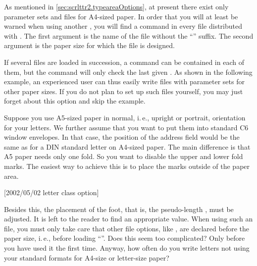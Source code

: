 \begin{Explain}
\begin{Declaration}
\end{Declaration}
As mentioned in \autoref{sec:scrlttr2.typeareaOptions}, at present
there exist only parameter sets and  files for A4-sized
paper. In order that you will at least be warned when using another
, you will find a 
command in every  file distributed with {\KOMAScript}. The
first argument is the name of the  file without the
``'' suffix. The second argument is the paper size for
which the  file is designed.

If several  files are loaded in succession, a
 command can be contained in each of
them, but the  command will only check the last given
. As shown in the following example, an experienced
user can thus easily write  files with parameter sets for
other paper sizes. If you do not plan to set up such  files
yourself, you may just forget about this option and skip the example.

\begin{Example}
  Suppose you use A5-sized paper in normal, i.\,e., upright or
  portrait, orientation for your letters. We further assume that you
  want to put them into standard C6 window envelopes. In that case,
  the position of the address field would be the same as for a DIN
  standard letter on A4-sized paper. The main difference is that A5
  paper needs only one fold. So you want to disable the upper and
  lower fold marks. The easiest way to achieve this is to place the
  marks outside of the paper area.
\begin{lstcode}
  [2002/05/02 letter class option]
\end{lstcode}
Besides this, the placement of the foot, that is, the pseudo-length
, must be adjusted. It is left to the reader to
find an appropriate value. When using such an  file, you
must only take care that other  file options, like
, are declared before the paper size, i.\,e., before loading
``''. Does this seem too complicated?  Only before
you have used it the first time. Anyway, how often do you write
letters not using your standard formats for A4-size or letter-size
paper?
\end{Example}
%
\end{Explain}


